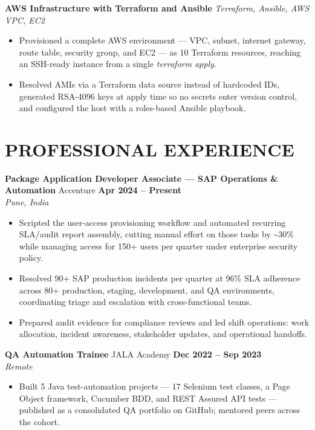 \documentclass[10pt,a4paper]{article}
\newcommand{\entry}[4]{%
  \textbf{#1} \textcolor{rulegray}{\textbar{}} #2 \hfill \textbf{#3}\\[-1pt]
  \textit{\small #4}\par\vspace{1pt}%
}
\newcommand{\project}[2]{%
  \textbf{#1} \textcolor{rulegray}{\textbar{}} \textit{#2}%
}
\begin{document}
\project{AWS Infrastructure with Terraform and Ansible}{Terraform, Ansible, AWS VPC, EC2}
\begin{itemize}
  \item Provisioned a complete AWS environment --- VPC, subnet, internet gateway, route table, security group, and EC2 --- as 10 Terraform resources, reaching an SSH-ready instance from a single \textit{terraform apply}.
  \item Resolved AMIs via a Terraform data source instead of hardcoded IDs, generated RSA-4096 keys at apply time so no secrets enter version control, and configured the host with a roles-based Ansible playbook.
\end{itemize}

\section{PROFESSIONAL EXPERIENCE}
\entry{Package Application Developer Associate --- SAP Operations \& Automation}{Accenture}{Apr 2024 -- Present}{Pune, India}
\begin{itemize}
  \item Scripted the user-access provisioning workflow and automated recurring SLA/audit report assembly, cutting manual effort on those tasks by \textasciitilde30\% while managing access for 150+ users per quarter under enterprise security policy.
  \item Resolved 90+ SAP production incidents per quarter at 96\% SLA adherence across 80+ production, staging, development, and QA environments, coordinating triage and escalation with cross-functional teams.
  \item Prepared audit evidence for compliance reviews and led shift operations: work allocation, incident awareness, stakeholder updates, and operational handoffs.
\end{itemize}

\entry{QA Automation Trainee}{JALA Academy}{Dec 2022 -- Sep 2023}{Remote}
\begin{itemize}
  \item Built 5 Java test-automation projects --- 17 Selenium test classes, a Page Object framework, Cucumber BDD, and REST Assured API tests --- published as a consolidated QA portfolio on GitHub; mentored peers across the cohort.
\end{itemize}

\end{document}
